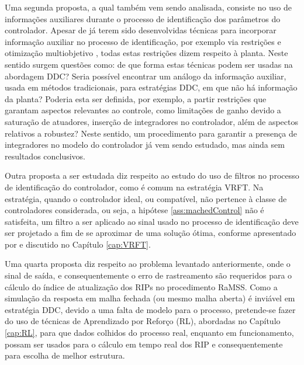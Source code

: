 Uma segunda proposta, a qual também vem sendo analisada, consiste no uso de informações auxiliares durante o processo de identificação dos parâmetros do controlador.  
Apesar de já terem sido desenvolvidas técnicas para incorporar informação auxiliar no processo de identificação, por exemplo via restrições e otimização multiobjetivo \citep{barroso2006}, todas estas restrições dizem respeito à planta.
Neste sentido surgem questões como: de que forma estas técnicas podem ser usadas na abordagem DDC?
Seria possível encontrar um análogo da informação auxiliar, usada em métodos tradicionais, para estratégias DDC, em que não há informação da planta?
Poderia esta ser definida, por exemplo, a partir restrições que garantam aspectos relevantes ao controle, como limitações de ganho devido a saturação de atuadores, inserção de integradores no controlador, além de aspectos relativos a robustez? Neste sentido, um procedimento para garantir a presença de integradores no modelo do controlador já vem sendo estudado, mas ainda sem resultados conclusivos.

Outra proposta a ser estudada diz respeito ao estudo do uso de filtros no processo de identificação do controlador, como é comum na estratégia VRFT. Na estratégia, quando o controlador ideal, ou compatível, não pertence à classe de controladores considerada, ou seja, a hipótese \ref{ass:machedControl} não é satisfeita, um filtro a ser aplicado ao sinal usado no processo de identificação deve ser projetado a fim de se aproximar de uma solução ótima, conforme apresentado por \cite{campi2002,campi2006} e discutido no Capítulo \ref{cap:VRFT}.

Uma quarta proposta diz respeito ao problema levantado anteriormente, onde o sinal de saída, e consequentemente o erro de rastreamento são requeridos para o cálculo do índice de atualização dos RIPs no procedimento RaMSS.
Como a simulação da resposta em malha fechada (ou mesmo malha aberta) é inviável em estratégia DDC, devido a uma falta de modelo para o processo, pretende-se fazer do uso de técnicas de Aprendizado por Reforço (RL), abordadas no Capítulo \ref{cap:RL}, para que dados colhidos do processo real, enquanto em funcionamento, possam ser usados para o cálculo em tempo real dos RIP e consequentemente para  escolha de melhor estrutura.

